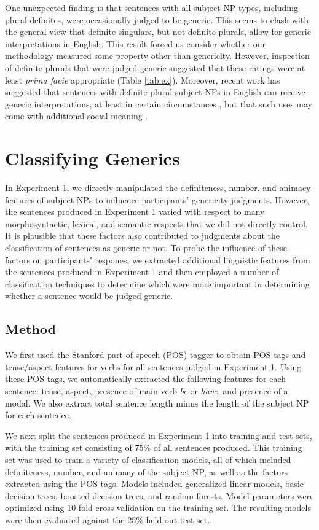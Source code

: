 \documentclass[10pt,letterpaper]{article}
\begin{document}
One unexpected finding is that sentences with all subject NP types, including plural definites, were occasionally judged to be generic. This seems to clash with the general view that definite singulars, but not definite plurals, allow for generic interpretations in English. This result forced us consider whether our methodology measured some property other than genericity. However, inspection of definite plurals that were judged generic suggested that these ratings were at least \emph{prima facie} appropriate (Table \ref{tab:ex}). Moreover, recent work has suggested that sentences with definite plural subject NPs in English can receive generic interpretations, at least in certain circumstances \cite{FarkasDeSwart2007}, but that such uses may come with additional social meaning \cite{Acton:2014}.

\section{Classifying Generics}

In Experiment 1, we directly manipulated the definiteness, number, and animacy features of subject NPs to influence participants' genericity judgments. However, the sentences produced in Experiment 1 varied with respect to many morphosyntactic, lexical, and semantic respects that we did not directly control. It is plausible that these factors also contributed to judgments about the classification of sentences as generic or not. To probe the influence of these factors on participants' respones, we extracted additional linguistic features from the sentences produced in Experiment 1 and then employed a number of classification techniques to determine which were more important in determining whether a sentence would be judged generic.

\subsection{Method}

We first used the Stanford part-of-speech (POS) tagger \cite{Toutanova:2003} to obtain POS tags and tense/aspect features for verbs for all sentences judged in Experiment 1. Using these POS tags, we automatically extracted the following features for each sentence: tense, aspect, presence of main verb \textit{be} or \textit{have}, and presence of a modal. We also extract total sentence length minus the length of the subject NP for each sentence.

We next split the sentences produced in Experiment 1 into training and test sets, with the training set consisting of 75\% of all sentences produced. This training set was used to train a variety of classification models, all of which included definiteness, number, and animacy of the subject NP, as well as the factors extracted using the POS tags. Models included generalized linear models, basic decision trees, boosted decision trees, and random forests. Model parameters were optimized using 10-fold cross-validation on the training set. The resulting models were then evaluated against the 25\% held-out test set.
\end{document}
